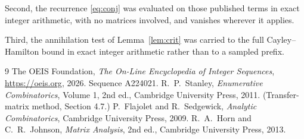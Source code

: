 \documentclass[11pt,a4paper]{article}
\theoremstyle{plain}
\theoremstyle{definition}
\begin{document}
Second, the recurrence \eqref{eq:conj} was evaluated on those published terms in exact
integer arithmetic, with no matrices involved, and vanishes wherever it applies.

Third, the annihilation test of Lemma~\ref{lem:crit} was carried to the full
Cayley--Hamilton bound in exact integer arithmetic rather than to a sampled prefix.

\begin{thebibliography}{9}
 The OEIS Foundation, \emph{The On-Line Encyclopedia of Integer
Sequences}, \url{https://oeis.org}, 2026. Sequence A224021.
 R.~P.~Stanley, \emph{Enumerative Combinatorics}, Volume 1, 2nd ed.,
Cambridge University Press, 2011. (Transfer-matrix method, Section 4.7.)
 P.~Flajolet and R.~Sedgewick, \emph{Analytic Combinatorics}, Cambridge
University Press, 2009.
 R.~A.~Horn and C.~R.~Johnson, \emph{Matrix Analysis}, 2nd ed., Cambridge
University Press, 2013.
\end{thebibliography}
\end{document}
